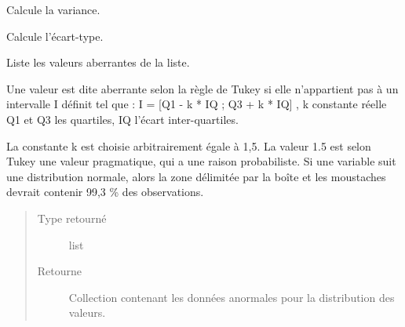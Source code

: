 \documentclass[letterpaper,10pt,french]{sphinxmanual}
\begin{document}

\begin{fulllineitems}
\label{\detokenize{addQuantitativesDiscretes:add.addQuantitativesDiscretes.variance}}
Calcule la variance.

\end{fulllineitems}


\begin{fulllineitems}
\label{\detokenize{addQuantitativesDiscretes:add.addQuantitativesDiscretes.ecartType}}
Calcule l’écart-type.

\end{fulllineitems}


\begin{fulllineitems}
\label{\detokenize{addQuantitativesDiscretes:add.addQuantitativesDiscretes.anomaliesTukey}}
Liste les valeurs aberrantes de la liste.

Une valeur est dite aberrante selon la règle de Tukey si elle n’appartient pas à un intervalle I définit tel que :
I = {[}Q1 - k * IQ ; Q3 + k * IQ{]} , k constante réelle Q1 et Q3 les quartiles, IQ l’écart inter-quartiles.

La constante k est choisie arbitrairement égale à 1,5. La valeur 1.5 est selon Tukey une valeur pragmatique, qui a une raison probabiliste.
Si une variable suit une distribution normale, alors la zone délimitée par la boîte et les moustaches devrait contenir 99,3 \% des observations.
\begin{quote}\begin{description}
\item[{Type retourné}] \leavevmode
list

\item[{Retourne}] \leavevmode
Collection contenant les données anormales pour la distribution des valeurs.

\end{description}\end{quote}

\end{fulllineitems}
\end{document}
